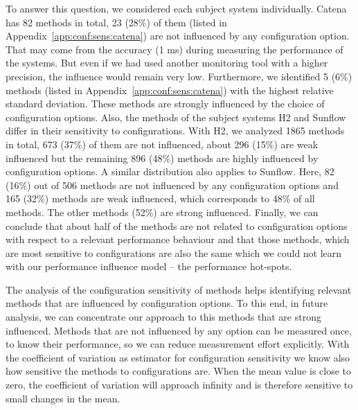 





To answer this question, we considered each subject system individually. Catena has 82 methods in total, 23 (28\%) of them (listed in Appendix~\ref{app:conf:sens:catena}) are not influenced by any configuration option. That may come from the accuracy (1 ms) during measuring the performance of the systems. But even if we had used another monitoring tool with a higher precision, the influence would remain very low. Furthermore, we identified 5 (6\%) methods (listed in Appendix~\ref{app:conf:sens:catena}) with the highest relative standard deviation. These methods are strongly influenced by the choice of configuration options. Also, the methods of the subject systems H2 and Sunflow differ in their sensitivity to configurations. With H2, we analyzed 1865 methods in total, 673 (37\%) of them are not influenced, about 296 (15\%) are weak influenced but the remaining 896 (48\%) methods are highly influenced by configuration options. A similar distribution also applies to Sunflow. Here, 82 (16\%) out of 506 methods are not influenced by any configuration options and 165 (32\%) methods are weak influenced, which corresponds to 48\% of all methods. The other methods (52\%) are strong influenced. Finally, we can conclude that about half of the methods are not related to configuration options with respect to a relevant performance behaviour and that those methods, which are most sensitive to configurations are also the same which we could not learn with our performance influence model -- the performance hot-spots. 


The analysis of the configuration sensitivity of methods helps identifying relevant methods that are influenced by configuration options. To this end, in future analysis, we can concentrate our approach to this methods that are strong influenced. Methods that are not influenced by any option can be measured once, to know their performance, so we can reduce measurement effort explicitly. With the coefficient of variation as estimator for configuration sensitivity we know also how sensitive the methods to configurations are. When the mean value is close to zero, the coefficient of variation will approach infinity and is therefore sensitive to small changes in the mean.

